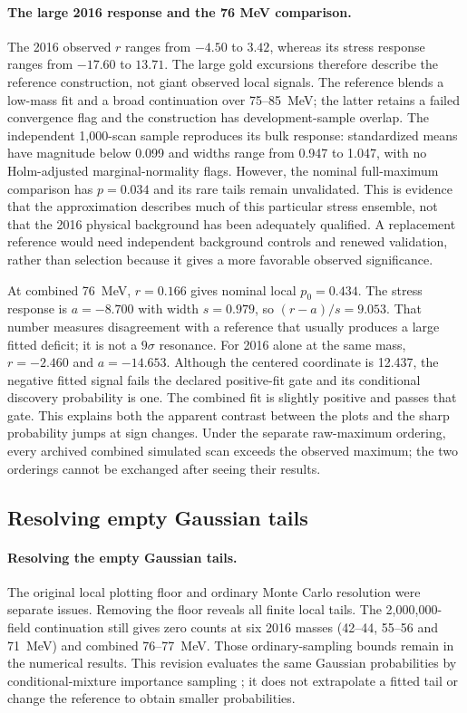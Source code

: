 \paragraph{The large 2016 response and the 76 MeV comparison.}
The 2016 observed $r$ ranges from $-4.50$ to $3.42$, whereas its stress
response ranges from $-17.60$ to $13.71$. The large gold excursions therefore
describe the reference construction, not giant observed local signals.
The reference blends a low-mass fit and a broad continuation over
75--85~MeV; the latter retains a failed convergence flag and the construction
has development-sample overlap. The independent 1,000-scan sample reproduces
its bulk response: standardized means have magnitude below 0.099 and widths
range from 0.947 to 1.047, with no Holm-adjusted marginal-normality flags.
However, the nominal full-maximum comparison has $p=0.034$ and its rare tails
remain unvalidated. This is evidence that the approximation describes much
of this particular stress ensemble, not that the 2016 physical background
has been adequately qualified. A replacement reference would need independent
background controls and renewed validation, rather than selection because
it gives a more favorable observed significance.

At combined 76~MeV, $r=0.166$ gives nominal local $p_0=0.434$.
The stress response is $a=-8.700$ with width $s=0.979$, so
$(r-a)/s=9.053$. That number measures disagreement with a reference that
usually produces a large fitted deficit; it is not a $9\sigma$ resonance.
For 2016 alone at the same mass, $r=-2.460$ and $a=-14.653$. Although the
centered coordinate is 12.437, the negative fitted signal fails the declared
positive-fit gate and its conditional discovery probability is one.
The combined fit is slightly positive and passes that gate. This explains
both the apparent contrast between the plots and the sharp probability
jumps at sign changes. Under the separate raw-maximum ordering, every
archived combined simulated scan exceeds the observed maximum; the two orderings
cannot be exchanged after seeing their results.

\subsection{Resolving empty Gaussian tails}
\paragraph{Resolving the empty Gaussian tails.}
The original local plotting floor and ordinary Monte Carlo resolution were
separate issues. Removing the floor reveals all finite local tails.
The 2,000,000-field continuation still gives zero counts at six 2016 masses
(42--44, 55--56 and 71~MeV) and combined 76--77~MeV. Those ordinary-sampling
bounds remain in the numerical results. This revision evaluates the same Gaussian
probabilities by conditional-mixture importance sampling
\cite{OwenMaximovChertkov2019}; it does not extrapolate a fitted tail or
change the reference to obtain smaller probabilities.

